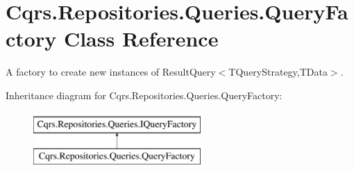 \hypertarget{classCqrs_1_1Repositories_1_1Queries_1_1QueryFactory}{}\section{Cqrs.\+Repositories.\+Queries.\+Query\+Factory Class Reference}
\label{classCqrs_1_1Repositories_1_1Queries_1_1QueryFactory}


A factory to create new instances of Result\+Query$<$\+T\+Query\+Strategy,\+T\+Data$>$.  


Inheritance diagram for Cqrs.\+Repositories.\+Queries.\+Query\+Factory\+:\begin{figure}[H]
\begin{center}
\leavevmode
\includegraphics[height=2.000000cm]{classCqrs_1_1Repositories_1_1Queries_1_1QueryFactory}
\end{center}
\end{figure}
